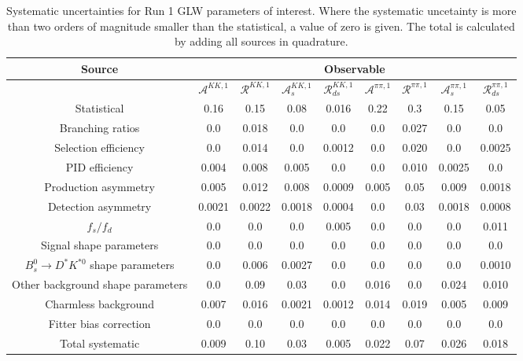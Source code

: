 \begin{sidewaystable}
  \centering
  \begin{tabular}{ccccccccc}
      \toprule
      Source & \multicolumn{8}{c}{Observable} \\
      \midrule
       & $\mathcal{A}^{KK,1}$ & $\mathcal{R}^{KK,1}$ & $\mathcal{A}_s^{KK,1}$ & $\mathcal{R}_{ds}^{KK,1}$ & $\mathcal{A}^{\pi\pi,1}$ & $\mathcal{R}^{\pi\pi,1}$ & $\mathcal{A}_s^{\pi\pi,1}$ & $\mathcal{R}_{ds}^{\pi\pi,1}$ \\
      \midrule
      Statistical & 0.16 & 0.15 & 0.08 & 0.016 & 0.22 & 0.3 & 0.15 & 0.05 \\
      \midrule
      Branching ratios & 0.0  & 0.018 & 0.0  & 0.0  & 0.0  & 0.027 & 0.0  & 0.0  \\
      Selection efficiency & 0.0  & 0.014 & 0.0  & 0.0012 & 0.0  & 0.020 & 0.0  & 0.0025 \\
      PID efficiency & 0.004 & 0.008 & 0.005 & 0.0  & 0.0  & 0.010 & 0.0025 & 0.0  \\
      Production asymmetry & 0.005 & 0.012 & 0.008 & 0.0009 & 0.005 & 0.05 & 0.009 & 0.0018 \\
      Detection asymmetry & 0.0021 & 0.0022 & 0.0018 & 0.0004 & 0.0  & 0.03 & 0.0018 & 0.0008 \\
      $f_s/f_d$ & 0.0  & 0.0  & 0.0  & 0.005 & 0.0  & 0.0  & 0.0  & 0.011 \\
      Signal shape parameters & 0.0  & 0.0  & 0.0  & 0.0  & 0.0  & 0.0  & 0.0  & 0.0  \\
      $B^0_s \to D^* K^{*0}$ shape parameters & 0.0  & 0.006 & 0.0027 & 0.0  & 0.0  & 0.0  & 0.0  & 0.0010 \\
      Other background shape parameters & 0.0  & 0.09 & 0.03 & 0.0  & 0.016 & 0.0  & 0.024 & 0.010 \\
      Charmless background & 0.007 & 0.016 & 0.0021 & 0.0012 & 0.014 & 0.019 & 0.005 & 0.009 \\
      Fitter bias correction & 0.0  & 0.0  & 0.0  & 0.0  & 0.0  & 0.0  & 0.0  & 0.0  \\
      \midrule
      Total systematic & 0.009 & 0.10 & 0.03 & 0.005 & 0.022 & 0.07 & 0.026 & 0.018 \\
      \bottomrule
  \end{tabular}
  \caption{Systematic uncertainties for Run 1 GLW parameters of interest. Where the systematic uncetainty is more than two orders of magnitude smaller than the statistical, a value of zero is given. The total is calculated by adding all sources in quadrature.}
\label{tab:KK_run1_systematics}
\end{sidewaystable}

